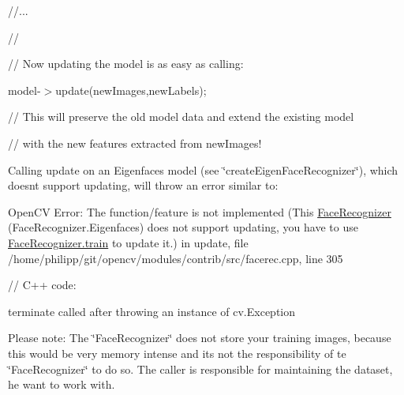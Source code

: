 {\ttfamily }

{\ttfamily }

{\ttfamily //...}

{\ttfamily }

{\ttfamily }

{\ttfamily //}

{\ttfamily }

{\ttfamily }

{\ttfamily // Now updating the model is as easy as calling\+:}

{\ttfamily }

{\ttfamily }

{\ttfamily model-\/$>$update(new\+Images,new\+Labels);}

{\ttfamily }

{\ttfamily }

{\ttfamily // This will preserve the old model data and extend the existing model}

{\ttfamily }

{\ttfamily }

{\ttfamily // with the new features extracted from new\+Images!}

{\ttfamily }

{\ttfamily }

{\ttfamily Calling update on an Eigenfaces model (see \char`\"{}create\+Eigen\+Face\+Recognizer\char`\"{}), which doesn\textquotesingle{}t support updating, will throw an error similar to\+: }

Open\+CV Error\+: The function/feature is not implemented (This \mbox{\hyperlink{classorg_1_1opencv_1_1contrib_1_1_face_recognizer}{Face\+Recognizer}} (Face\+Recognizer.\+Eigenfaces) does not support updating, you have to use \mbox{\hyperlink{classorg_1_1opencv_1_1contrib_1_1_face_recognizer_a2b9e657ee7276997ab184449c3251c08}{Face\+Recognizer.\+train}} to update it.) in update, file /home/philipp/git/opencv/modules/contrib/src/facerec.cpp, line 305 {\ttfamily }

{\ttfamily }

{\ttfamily }

{\ttfamily // C++ code\+:}

{\ttfamily }

{\ttfamily }

{\ttfamily terminate called after throwing an instance of \textquotesingle{}cv.\+Exception\textquotesingle{}}

{\ttfamily }

{\ttfamily }

{\ttfamily Please note\+: The \char`\"{}\+Face\+Recognizer\char`\"{} does not store your training images, because this would be very memory intense and it\textquotesingle{}s not the responsibility of te \char`\"{}\+Face\+Recognizer\char`\"{} to do so. The caller is responsible for maintaining the dataset, he want to work with. }



